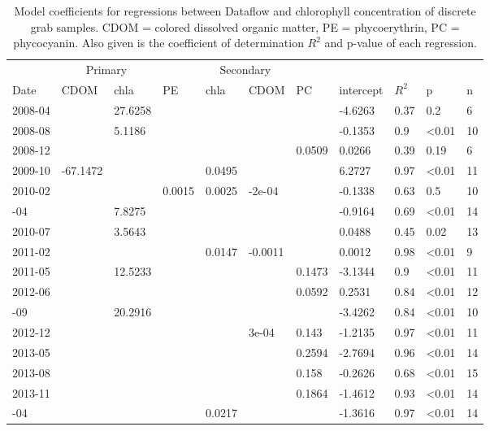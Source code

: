 \begin{table}

\caption{\label{tab:}Model coefficients for regressions between Dataflow and chlorophyll concentration of discrete grab samples. CDOM = colored dissolved organic matter, PE = phycoerythrin, PC = phycocyanin. Also given is the coefficient of determination $R^2$ and p-value of each regression.}
\centering
\begin{tabular}[t]{lllllllllll}
\toprule
\multicolumn{1}{c}{ } & \multicolumn{2}{c}{Primary} & \multicolumn{4}{c}{Secondary} \\ \cmidrule(l{2pt}r{2pt}){2-3} \cmidrule(l{2pt}r{2pt}){4-7}
Date & CDOM & chla & PE & chla & CDOM & PC & intercept & $R^2$ & p & n\\
\midrule
2008-04 &  & 27.6258 &  &  &  &  & -4.6263 & 0.37 & 0.2 & 6\\
2008-08 &  & 5.1186 &  &  &  &  & -0.1353 & 0.9 & \textless0.01 & 10\\
2008-12 &  &  &  &  &  & 0.0509 & 0.0266 & 0.39 & 0.19 & 6\\
2009-10 & -67.1472 &  &  & 0.0495 &  &  & 6.2727 & 0.97 & \textless0.01 & 11\\
2010-02 &  &  & 0.0015 & 0.0025 & -2e-04 &  & -0.1338 & 0.63 & 0.5 & 10\\
\addlinespace
2010-04 &  & 7.8275 &  &  &  &  & -0.9164 & 0.69 & \textless0.01 & 14\\
2010-07 &  & 3.5643 &  &  &  &  & 0.0488 & 0.45 & 0.02 & 13\\
2011-02 &  &  &  & 0.0147 & -0.0011 &  & 0.0012 & 0.98 & \textless0.01 & 9\\
2011-05 &  & 12.5233 &  &  &  & 0.1473 & -3.1344 & 0.9 & \textless0.01 & 11\\
2012-06 &  &  &  &  &  & 0.0592 & 0.2531 & 0.84 & \textless0.01 & 12\\
\addlinespace
2012-09 &  & 20.2916 &  &  &  &  & -3.4262 & 0.84 & \textless0.01 & 10\\
2012-12 &  &  &  &  & 3e-04 & 0.143 & -1.2135 & 0.97 & \textless0.01 & 11\\
2013-05 &  &  &  &  &  & 0.2594 & -2.7694 & 0.96 & \textless0.01 & 14\\
2013-08 &  &  &  &  &  & 0.158 & -0.2626 & 0.68 & \textless0.01 & 15\\
2013-11 &  &  &  &  &  & 0.1864 & -1.4612 & 0.93 & \textless0.01 & 14\\
\addlinespace
2014-04 &  &  &  & 0.0217 &  &  & -1.3616 & 0.97 & \textless0.01 & 14\\

\end{tabular}
\end{table}
